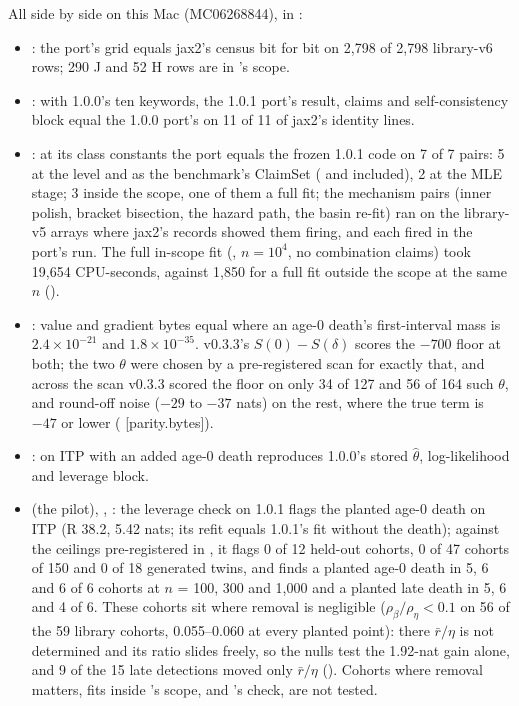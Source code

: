 \tplEvidence
All side by side on this Mac (MC06268844), in :
\begin{itemize}[nosep]
  \item {}: the port's grid equals jax2's census bit for bit on 2,798 of 2,798 library-v6 rows;
    290 J and 52 H rows are in 's scope.
  \item {}: with 1.0.0's ten keywords, the 1.0.1 port's result, claims and self-consistency
    block equal the 1.0.0 port's on 11 of 11 of jax2's identity lines.
  \item {}: at its class constants the port equals the frozen 1.0.1 code on 7 of 7 pairs: 5 at the
     level and as the benchmark's ClaimSet ( and  included), 2 at the MLE
    stage; 3 inside the scope, one of them a full fit; the mechanism pairs (inner polish, bracket bisection, the hazard
    path, the basin re-fit) ran on the library-v5 arrays where jax2's records showed them firing, and each fired in the
    port's run. The full in-scope fit (, $n=10^4$, no combination claims) took 19,654
    CPU-seconds, against 1,850 for a full fit outside the scope at the same $n$ ().
  \item {}: value and gradient bytes equal where an age-0 death's first-interval mass is
    $2.4\times10^{-21}$ and $1.8\times10^{-35}$. v0.3.3's $S(0)-S(\delta)$ scores the $-700$ floor at both; the two
    $\theta$ were chosen by a pre-registered scan for exactly that, and across the scan v0.3.3 scored the floor on only
    34 of 127 and 56 of 164 such $\theta$, and round-off noise ($-29$ to $-37$ nats) on the rest, where the true term is
    $-47$ or lower ( [parity.bytes]).
  \item {}:  on ITP with an added age-0 death reproduces
    1.0.0's stored $\hat\theta$, log-likelihood and leverage block.
  \item {} (the pilot), , : the leverage check on 1.0.1
    flags the planted age-0 death on ITP (R 38.2, 5.42 nats; its refit equals 1.0.1's fit without the death); against
    the ceilings pre-registered in , it flags 0 of 12 held-out cohorts, 0 of 47
    cohorts of 150 and 0 of 18 generated twins, and finds a planted age-0 death in 5, 6 and 6 of 6 cohorts at $n$ = 100,
    300 and 1,000 and a planted late death in 5, 6 and 4 of 6. These cohorts sit where removal is negligible
    ($\rho_\beta/\rho_\eta<0.1$ on 56 of the 59 library cohorts, 0.055--0.060 at every planted point): there
    $\bar r/\eta$ is not determined and its ratio slides freely, so the nulls test the 1.92-nat gain alone, and 9 of the
    15 late detections moved only $\bar r/\eta$ ().
    Cohorts where removal matters, fits inside 's scope, and 's check, are not
    tested.
\end{itemize}

